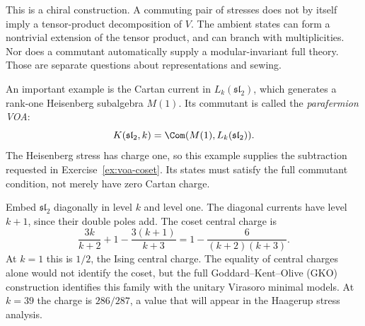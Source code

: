 This is a chiral construction. A commuting pair of stresses does
not by itself imply a tensor-product decomposition of $V$.
The ambient states can form a nontrivial extension of the tensor
product, and can branch with multiplicities. Nor does a commutant
automatically supply a modular-invariant full theory. Those are
separate questions about representations and sewing.

An important example is the Cartan current in
$L_k(\mathfrak{sl}_2)$, which generates a rank-one Heisenberg
subalgebra $M(1)$. Its commutant is called the \emph{parafermion VOA}:
\[
 K(\mathfrak{sl}_2,k)=\Com(M(1),L_k(\mathfrak{sl}_2)).
\]
The Heisenberg stress has charge one, so this
example supplies the subtraction requested in
Exercise~\ref{ex:voa-coset}. Its states must satisfy the full
commutant condition, not merely have zero Cartan charge.

\begin{example}
Embed $\mathfrak{sl}_2$ diagonally in level $k$ and level one.
The diagonal currents have level $k+1$, since their double poles
add. The coset central charge is
\[
 \frac{3k}{k+2}+1-\frac{3(k+1)}{k+3}
 =1-\frac6{(k+2)(k+3)}.
\]
At $k=1$ this is $1/2$, the Ising central charge. The equality of
central charges alone would not identify the coset, but the full
Goddard--Kent--Olive (GKO) construction identifies this family with the unitary Virasoro
minimal models. At $k=39$ the charge is $286/287$, a value that
will appear in the Haagerup stress analysis.
\end{example}

